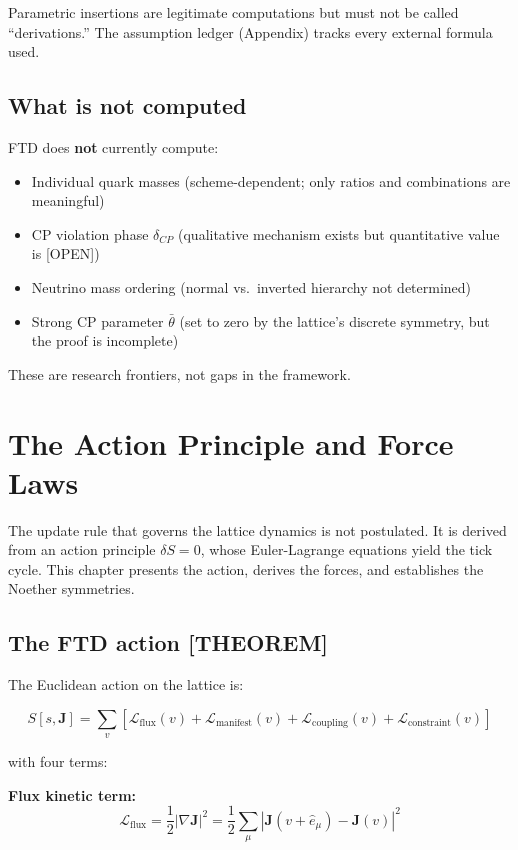 \documentclass[
  11pt,
  letterpaper,
  twoside,
  openany]{book}
\makeatletter
\providecommand{\tightlist}{%
  \setlength{\itemsep}{0pt}\setlength{\parskip}{0pt}}
\let\orig@section\section
\renewcommand{\section}{\needspace{8\baselineskip}\orig@section}
\makeatother
\begin{document}
Parametric insertions are legitimate computations but must not be called
``derivations.'' The assumption ledger (Appendix) tracks every external
formula used.

\section{What is not computed}\label{what-is-not-computed}

FTD does \textbf{not} currently compute:

\begin{itemize}
\tightlist
\item
  Individual quark masses (scheme-dependent; only ratios and
  combinations are meaningful)
\item
  CP violation phase \(\delta_{CP}\) (qualitative mechanism exists but
  quantitative value is {[}OPEN{]})
\item
  Neutrino mass ordering (normal vs.~inverted hierarchy not determined)
\item
  Strong CP parameter \(\bar{\theta}\) (set to zero by the lattice's
  discrete symmetry, but the proof is incomplete)
\end{itemize}

These are research frontiers, not gaps in the framework.

\chapter{The Action Principle and Force Laws}\label{sec-action}

The update rule that governs the lattice dynamics is not postulated. It
is derived from an action principle \(\delta S = 0\), whose
Euler-Lagrange equations yield the tick cycle. This chapter presents the
action, derives the forces, and establishes the Noether symmetries.

\section{The FTD action {[}THEOREM{]}}\label{the-ftd-action-theorem}

The Euclidean action on the lattice is:

\[
S[s, \mathbf{J}] = \sum_v \left[ \mathcal{L}_{\text{flux}}(v) + \mathcal{L}_{\text{manifest}}(v) + \mathcal{L}_{\text{coupling}}(v) + \mathcal{L}_{\text{constraint}}(v) \right]
\tag{14.1}
\]

with four terms:

\textbf{Flux kinetic term:} \[
\mathcal{L}_{\text{flux}} = \frac{1}{2} |\nabla \mathbf{J}|^2 = \frac{1}{2} \sum_{\mu} |\mathbf{J}(v + \hat{e}_\mu) - \mathbf{J}(v)|^2
\tag{14.2}
\]
\end{document}
